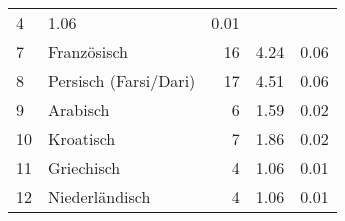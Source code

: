 \begin{longtable}{lXrrr}
       \num{4} &
       \num[round-mode=places,round-precision=2]{1,06} &
         \num[round-mode=places,round-precision=2]{0,01} \\

     7 &
     \multicolumn{1}{X}{ Französisch   } &


       \num{16} &
       \num[round-mode=places,round-precision=2]{4,24} &
         \num[round-mode=places,round-precision=2]{0,06} \\

     8 &
     \multicolumn{1}{X}{ Persisch (Farsi/Dari)   } &


       \num{17} &
       \num[round-mode=places,round-precision=2]{4,51} &
         \num[round-mode=places,round-precision=2]{0,06} \\

     9 &
     \multicolumn{1}{X}{ Arabisch   } &


       \num{6} &
       \num[round-mode=places,round-precision=2]{1,59} &
         \num[round-mode=places,round-precision=2]{0,02} \\

     10 &
     \multicolumn{1}{X}{ Kroatisch   } &


       \num{7} &
       \num[round-mode=places,round-precision=2]{1,86} &
         \num[round-mode=places,round-precision=2]{0,02} \\

     11 &
     \multicolumn{1}{X}{ Griechisch   } &


       \num{4} &
       \num[round-mode=places,round-precision=2]{1,06} &
         \num[round-mode=places,round-precision=2]{0,01} \\

     12 &
     \multicolumn{1}{X}{ Niederländisch   } &


       \num{4} &
       \num[round-mode=places,round-precision=2]{1,06} &
         \num[round-mode=places,round-precision=2]{0,01} \\


\end{longtable}
